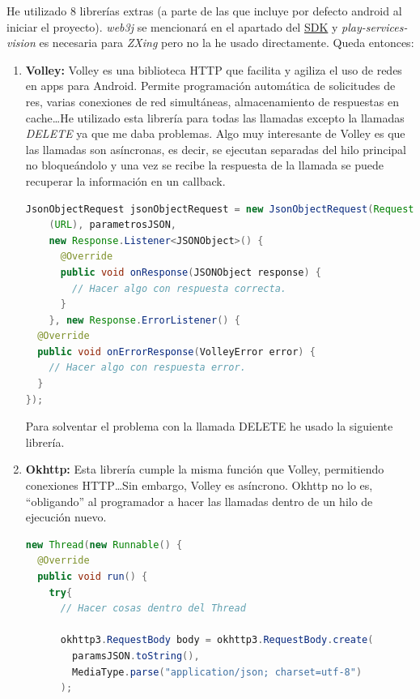 He utilizado 8 librerías extras (a parte de las que incluye por defecto android al iniciar el proyecto). \emph{web3j} se mencionará en el apartado del \hyperref[sec:SDK]{SDK} y \emph{play-services-vision} es necesaria para \emph{ZXing} pero no la he usado directamente. Queda entonces: \\
\begin{enumerate}
\item \textbf{Volley: } Volley es una biblioteca HTTP que facilita y agiliza el uso de redes en apps para Android. Permite programación automática de solicitudes de res, varias conexiones de red simultáneas, almacenamiento de respuestas en cache\dots He utilizado esta librería para todas las llamadas excepto la llamadas \emph{DELETE} ya que me daba problemas. Algo muy interesante de Volley es que las llamadas son asíncronas, es decir, se ejecutan separadas del hilo principal no bloqueándolo y una vez se recibe la respuesta de la llamada se puede recuperar la información en un callback.

\begin{lstlisting}[language=Java,float=ht,caption={[Java] Ejemplo de llamada POST con Volley.},label=lst:volley]
JsonObjectRequest jsonObjectRequest = new JsonObjectRequest(Request.Method.POST,
    (URL), parametrosJSON,
    new Response.Listener<JSONObject>() {
      @Override
      public void onResponse(JSONObject response) {
        // Hacer algo con respuesta correcta.
      }
    }, new Response.ErrorListener() {
  @Override
  public void onErrorResponse(VolleyError error) {
    // Hacer algo con respuesta error.
  }
});
\end{lstlisting}

Para solventar el problema con la llamada DELETE he usado la siguiente librería.

\item \textbf{Okhttp: } Esta librería cumple la misma función que Volley, permitiendo conexiones HTTP\dots Sin embargo, Volley es asíncrono. Okhttp no lo es, ``obligando'' al programador a hacer las llamadas dentro de un hilo de ejecución nuevo.

\begin{lstlisting}[language=Java,float=ht,caption={[Java] Ejemplo de llamada DELETE con OkHttp.},label=lst:okhttp]
new Thread(new Runnable() {
  @Override
  public void run() {
    try{
      // Hacer cosas dentro del Thread

      okhttp3.RequestBody body = okhttp3.RequestBody.create(
        paramsJSON.toString(), 
        MediaType.parse("application/json; charset=utf-8")
      );


\end{lstlisting}
\end{enumerate}
